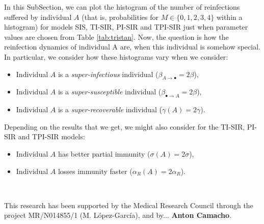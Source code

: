 \documentclass[preprint,12pt]{elsarticle}
\begin{document}
\par In this SubSection, we can plot the histogram of the number of reinfections suffered by individual $A$ (that is, probabilities for $M\in\{0,1,2,3,4\}$ within a histogram) for models SIS, TI-SIR, PI-SIR and TPI-SIR just when parameter values are chosen from Table \ref{tab:tristan}. Now, the question is how the reinfection dynamics of individual A are, when this individual is somehow special. In particular, we consider how these histograms vary when we consider:
\begin{itemize}
 \item Individual $A$ is a {\it super-infectious} individual ($\beta_{A\rightarrow\bullet}=2\beta$),
 \item Individual $A$ is a {\it super-susceptible} individual ($\beta_{\bullet\rightarrow A}=2\beta$),
 \item Individual $A$ is a {\it super-recoverable} individual ($\gamma(A)=2\gamma$).
\end{itemize}

\par Depending on the results that we get, we might also consider for the TI-SIR, PI-SIR and TPI-SIR models:
\begin{itemize}
 \item Individual $A$ has better partial immunity ($\sigma(A)=2\sigma$),
 \item Individual $A$ losses immunity faster ($\alpha_R(A)=2\alpha_R$).
\end{itemize}

\vspace{1cm}

\par{}\\

\par\noindent This research has been supported by the Medical Research Council through the project MR/N014855/1 (M. L\'opez-Garc\'ia), and by... {\bf Anton Camacho}.\\

\vspace{1cm}

\par{}



\vspace{1cm}

\par{}\\
\end{document}
